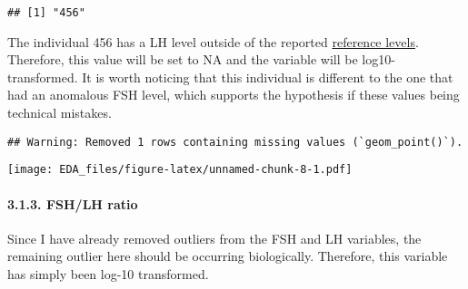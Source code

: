 \documentclass[
]{article}
\newenvironment{Shaded}{\begin{snugshade}}{\end{snugshade}}
\newcommand{\AttributeTok}[1]{\textcolor[rgb]{0.77,0.63,0.00}{#1}}
\newcommand{\ConstantTok}[1]{\textcolor[rgb]{0.00,0.00,0.00}{#1}}
\newcommand{\DecValTok}[1]{\textcolor[rgb]{0.00,0.00,0.81}{#1}}
\newcommand{\FloatTok}[1]{\textcolor[rgb]{0.00,0.00,0.81}{#1}}
\newcommand{\FunctionTok}[1]{\textcolor[rgb]{0.00,0.00,0.00}{#1}}
\newcommand{\NormalTok}[1]{#1}
\newcommand{\OtherTok}[1]{\textcolor[rgb]{0.56,0.35,0.01}{#1}}
\newcommand{\SpecialCharTok}[1]{\textcolor[rgb]{0.00,0.00,0.00}{#1}}
\newcommand{\StringTok}[1]{\textcolor[rgb]{0.31,0.60,0.02}{#1}}
\begin{document}
\begin{verbatim}
## [1] "456"
\end{verbatim}

The individual 456 has a LH level outside of the reported
\href{https://www.urmc.rochester.edu/encyclopedia/content.aspx?ContentTypeID=167\&ContentID=luteinizing_hormone_blood}{reference
levels}. Therefore, this value will be set to NA and the variable will
be log10-transformed. It is worth noticing that this individual is
different to the one that had an anomalous FSH level, which supports the
hypothesis if these values being technical mistakes.

\begin{Shaded}
\end{Shaded}

\begin{verbatim}
## Warning: Removed 1 rows containing missing values (`geom_point()`).
\end{verbatim}

\texttt{[image: EDA\_files/figure-latex/unnamed-chunk-8-1.pdf]}

\hypertarget{fshlh-ratio}{%
\paragraph{3.1.3. FSH/LH ratio}\label{fshlh-ratio}}

Since I have already removed outliers from the FSH and LH variables, the
remaining outlier here should be occurring biologically. Therefore, this
variable has simply been log-10 transformed.
\end{document}

